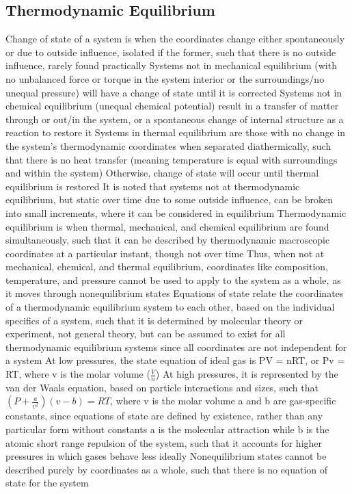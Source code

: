 \documentclass[11 pt, twoside]{article}
\newenvironment{outline*}
{
	\begin{outline}[enumerate]
	}
	{\end{outline}
}
\begin{document}
\subsection{Thermodynamic Equilibrium}
\begin{outline*}
\1 Change of state of a system is when the coordinates change either spontaneously or due to outside influence, isolated if the former, such that there is no outside influence, rarely found practically
\2 Systems not in mechanical equilibrium (with no unbalanced force or torque in the system interior or the surroundings/no unequal pressure) will have a change of state until it is corrected
\2 Systems not in chemical equilibrium (unequal chemical potential) result in a transfer of matter through or out/in the system, or a spontaneous change of internal structure as a reaction to restore it
\2 Systems in thermal equilibrium are those with no change in the system's thermodynamic coordinates when separated diathermically, such that there is no heat transfer (meaning temperature is equal with surroundings and within the system)
\3 Otherwise, change of state will occur until thermal equilibrium is restored
\2 It is noted that systems not at thermodynamic equilibrium, but static over time due to some outside influence, can be broken into small increments, where it can be considered in equilibrium
\1 Thermodynamic equilibrium is when thermal, mechanical, and chemical equilibrium are found simultaneously, such that it can be described by thermodynamic macroscopic coordinates at a particular instant, though not over time
\2 Thus, when not at mechanical, chemical, and thermal equilibrium, coordinates like composition, temperature, and pressure cannot be used to apply to the system as a whole, as it moves through nonequilibrium states
\1 Equations of state relate the coordinates of a thermodynamic equilibrium system to each other, based on the individual specifics of a system, such that it is determined by molecular theory or experiment, not general theory, but can be assumed to exist for all thermodynamic equilibrium systems since all coordinates are not independent for a system
\2 At low pressures, the state equation of ideal gas is PV = nRT, or Pv = RT, where v is the molar volume ($\frac{V}{n}$)
\2 At high pressures, it is represented by the van der Waals equation, based on particle interactions and sizes, such that $(P + \frac{a}{v^2})(v - b) = RT$, where v is the molar volume
\3 a and b are gas-specific constants, since equations of state are defined by existence, rather than any particular form without constants
\3 a is the molecular attraction while b is the atomic short range repulsion of the system, such that it accounts for higher pressures in which gases behave less ideally 
\2 Nonequilibrium states cannot be described purely by coordinates as a whole, such that there is no equation of state for the system
\end{outline*}
\end{document}
